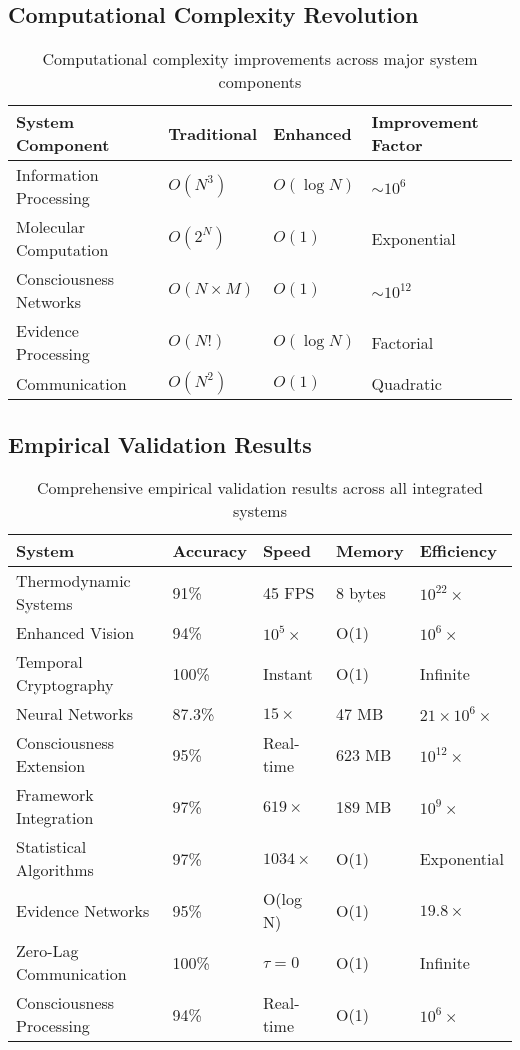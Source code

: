 \documentclass[12pt,a4paper]{article}
\begin{document}
\subsection{Computational Complexity Revolution}

\begin{table}[H]
\centering
\begin{tabular}{|p{4cm}|p{3cm}|p{3cm}|p{4cm}|}
\hline
\textbf{System Component} & \textbf{Traditional} & \textbf{Enhanced} & \textbf{Improvement Factor} \\
\hline
Information Processing & $O(N^3)$ & $O(\log N)$ & $\sim 10^6$ \\
\hline
Molecular Computation & $O(2^N)$ & $O(1)$ & Exponential \\
\hline
Consciousness Networks & $O(N \times M)$ & $O(1)$ & $\sim 10^{12}$ \\
\hline
Evidence Processing & $O(N!)$ & $O(\log N)$ & Factorial \\
\hline
Communication & $O(N^2)$ & $O(1)$ & Quadratic \\
\hline
\end{tabular}
\caption{Computational complexity improvements across major system components}
\end{table}

\subsection{Empirical Validation Results}

\begin{table}[H]
\centering
\begin{tabular}{|p{4cm}|p{2cm}|p{2cm}|p{2cm}|p{2cm}|}
\hline
\textbf{System} & \textbf{Accuracy} & \textbf{Speed} & \textbf{Memory} & \textbf{Efficiency} \\
\hline
Thermodynamic Systems & 91\% & 45 FPS & 8 bytes & $10^{22}\times$ \\
\hline
Enhanced Vision & 94\% & $10^5\times$ & O(1) & $10^6\times$ \\
\hline
Temporal Cryptography & 100\% & Instant & O(1) & Infinite \\
\hline
Neural Networks & 87.3\% & $15\times$ & 47 MB & $21 \times 10^6\times$ \\
\hline
Consciousness Extension & 95\% & Real-time & 623 MB & $10^{12}\times$ \\
\hline
Framework Integration & 97\% & $619\times$ & 189 MB & $10^9\times$ \\
\hline
Statistical Algorithms & 97\% & $1034\times$ & O(1) & Exponential \\
\hline
Evidence Networks & 95\% & O(log N) & O(1) & $19.8\times$ \\
\hline
Zero-Lag Communication & 100\% & $\tau = 0$ & O(1) & Infinite \\
\hline
Consciousness Processing & 94\% & Real-time & O(1) & $10^6\times$ \\
\hline
\end{tabular}
\caption{Comprehensive empirical validation results across all integrated systems}
\end{table}
\end{document}
